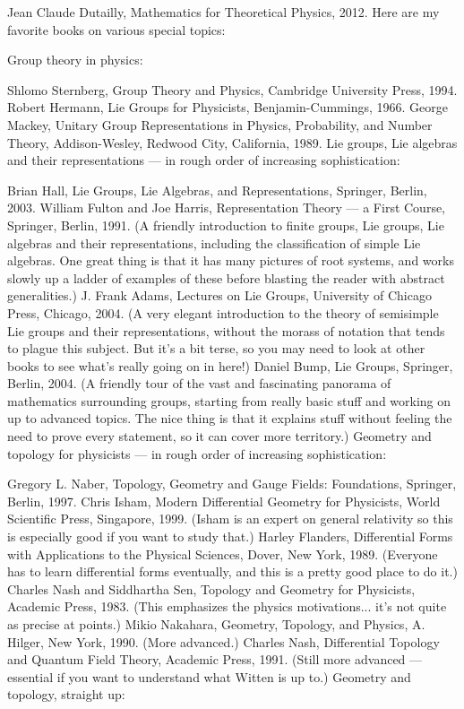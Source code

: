 \documentclass[10pt,a4paper]{book}
\theoremstyle{definition}
\begin{document}
Jean Claude Dutailly, Mathematics for Theoretical Physics, 2012.
Here are my favorite books on various special topics:

Group theory in physics:

Shlomo Sternberg, Group Theory and Physics, Cambridge University Press, 1994.
Robert Hermann, Lie Groups for Physicists, Benjamin-Cummings, 1966.
George Mackey, Unitary Group Representations in Physics, Probability, and Number Theory, Addison-Wesley, Redwood City, California, 1989.
Lie groups, Lie algebras and their representations — in rough order of increasing sophistication:

Brian Hall, Lie Groups, Lie Algebras, and Representations, Springer, Berlin, 2003.
William Fulton and Joe Harris, Representation Theory — a First Course, Springer, Berlin, 1991. (A friendly introduction to finite groups, Lie groups, Lie algebras and their representations, including the classification of simple Lie algebras. One great thing is that it has many pictures of root systems, and works slowly up a ladder of examples of these before blasting the reader with abstract generalities.)
J. Frank Adams, Lectures on Lie Groups, University of Chicago Press, Chicago, 2004. (A very elegant introduction to the theory of semisimple Lie groups and their representations, without the morass of notation that tends to plague this subject. But it's a bit terse, so you may need to look at other books to see what's really going on in here!)
Daniel Bump, Lie Groups, Springer, Berlin, 2004. (A friendly tour of the vast and fascinating panorama of mathematics surrounding groups, starting from really basic stuff and working on up to advanced topics. The nice thing is that it explains stuff without feeling the need to prove every statement, so it can cover more territory.)
Geometry and topology for physicists — in rough order of increasing sophistication:

Gregory L. Naber, Topology, Geometry and Gauge Fields: Foundations, Springer, Berlin, 1997.
Chris Isham, Modern Differential Geometry for Physicists, World Scientific Press, Singapore, 1999. (Isham is an expert on general relativity so this is especially good if you want to study that.)
Harley Flanders, Differential Forms with Applications to the Physical Sciences, Dover, New York, 1989. (Everyone has to learn differential forms eventually, and this is a pretty good place to do it.)
Charles Nash and Siddhartha Sen, Topology and Geometry for Physicists, Academic Press, 1983. (This emphasizes the physics motivations... it's not quite as precise at points.)
Mikio Nakahara, Geometry, Topology, and Physics, A. Hilger, New York, 1990. (More advanced.)
Charles Nash, Differential Topology and Quantum Field Theory, Academic Press, 1991. (Still more advanced — essential if you want to understand what Witten is up to.)
Geometry and topology, straight up:
\end{document}
